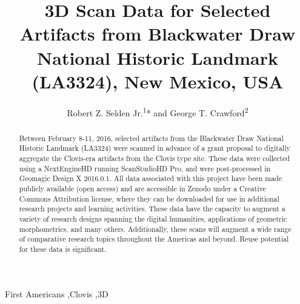 \documentclass[preprint,12pt]{elsarticle}
\begin{document}
\begin{frontmatter}


\title{3D Scan Data for Selected Artifacts from Blackwater Draw National Historic Landmark (LA3324), New Mexico, USA}




\author{Robert Z. Selden Jr.\textsuperscript{1}* and George T. Crawford\textsuperscript{2}} %
\address{\textsuperscript{1}\textit{Heritage Research Center, Stephen F. Austin State University, USA}} %
\address{\textsuperscript{2}\textit{Blackwater Draw National Historic Landmark, Eastern New Mexico University, USA}}%

\begin{abstract}
Between February 8-11, 2016, selected artifacts from the Blackwater Draw National Historic Landmark (LA3324) were scanned in advance of a grant proposal to digitally aggregate the Clovis-era artifacts from the Clovis type site. These data were collected using a NextEngineHD running ScanStudioHD Pro, and were post-processed in Geomagic Design X 2016.0.1. All data associated with this project have been made publicly available (open access) and are accessible in Zenodo under a Creative Commons Attribution license, where they can be downloaded for use in additional research projects and learning activities. These data have the capacity to augment a variety of research designs spanning the digital humanities, applications of geometric morphometrics, and many others. Additionally, these scans will augment a wide range of comparative research topics throughout the Americas and beyond. Reuse potential for these data is significant.
\end{abstract}

\begin{keyword}
First Americans \sep Clovis \sep 3D


\end{keyword}

\end{frontmatter}
\end{document}
